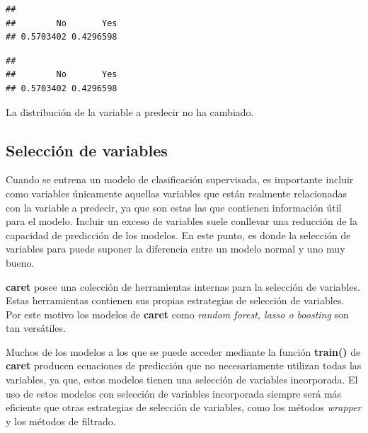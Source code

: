 \documentclass[]{article}
\newenvironment{Shaded}{\begin{snugshade}}{\end{snugshade}}
\newcommand{\KeywordTok}[1]{\textcolor[rgb]{0.13,0.29,0.53}{\textbf{#1}}}
\newcommand{\NormalTok}[1]{#1}
\newcommand{\OperatorTok}[1]{\textcolor[rgb]{0.81,0.36,0.00}{\textbf{#1}}}
\begin{document}
\vspace{2mm}

\begin{Shaded}
\end{Shaded}

\begin{verbatim}
## 
##        No       Yes 
## 0.5703402 0.4296598
\end{verbatim}

\begin{Shaded}
\end{Shaded}

\begin{verbatim}
## 
##        No       Yes 
## 0.5703402 0.4296598
\end{verbatim}

La distribución de la variable a predecir no ha cambiado.

\hypertarget{selecciuxf3n-de-variables}{%
\subsection{Selección de variables}\label{selecciuxf3n-de-variables}}

Cuando se entrena un modelo de clasificación supervisada, es importante incluir como variables únicamente aquellas variables que están realmente relacionadas con la variable a predecir, ya que son estas las que contienen información útil para el modelo. Incluir un exceso de variables suele conllevar una reducción de la capacidad de predicción de los modelos. En este punto, es donde la selección de variables para puede suponer la diferencia entre un modelo normal y uno muy bueno.

\textbf{caret} posee una colección de herramientas internas para la selección de variables. Estas herramientas contienen sus propias estrategias de selección de variables. Por este motivo los modelos de \textbf{caret} como \textit{random forest, lasso o boosting} son tan versátiles.

Muchos de los modelos a los que se puede acceder mediante la función \textbf{train()} de \textbf{caret} producen ecuaciones de predicción que no necesariamente utilizan todas las variables, ya que, estos modelos tienen una selección de variables incorporada. El uso de estos modelos con selección de variables incorporada siempre será más eficiente que otras estrategias de selección de variables, como los métodos \textit{wrapper} y los métodos de filtrado.
\end{document}
